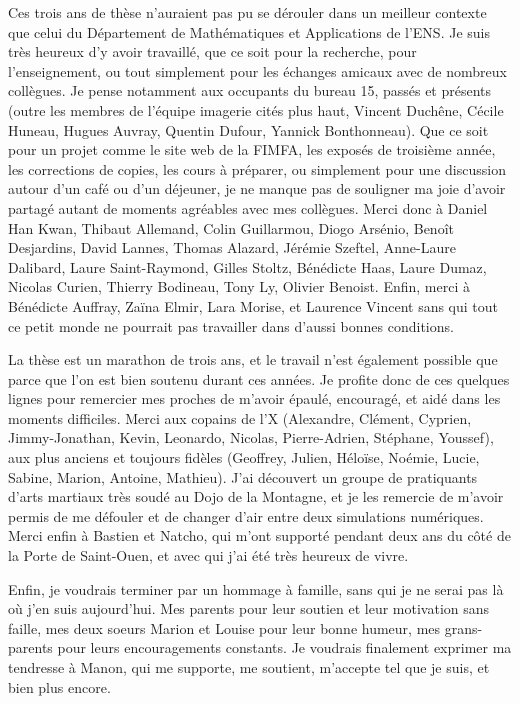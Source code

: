 Ces trois ans de thèse n'auraient pas pu se dérouler dans un meilleur contexte
que celui du Département de Mathématiques et Applications de l'ENS. Je suis
très heureux d'y avoir travaillé, que ce soit pour la recherche, pour
l'enseignement, ou tout simplement pour les échanges amicaux avec de nombreux
collègues. Je pense notamment aux occupants du bureau 15, passés et présents
(outre les membres de l'équipe imagerie cités plus haut, Vincent 
Duchêne, Cécile Huneau, Hugues Auvray, Quentin Dufour, Yannick Bonthonneau).
Que ce soit pour un projet comme le site web de la FIMFA, les exposés de
troisième année, les corrections de copies, les cours à préparer, ou simplement 
pour une discussion autour d'un café ou d'un déjeuner, je ne manque pas de 
souligner ma joie d'avoir partagé autant de moments agréables avec mes collègues.
Merci donc à Daniel Han Kwan, Thibaut Allemand, Colin Guillarmou, Diogo Arsénio,
Benoît Desjardins, David Lannes, Thomas Alazard, Jérémie Szeftel, Anne-Laure Dalibard,
Laure Saint-Raymond, Gilles Stoltz, Bénédicte Haas, Laure Dumaz, Nicolas Curien,
Thierry Bodineau, Tony Ly, Olivier Benoist.
Enfin, merci à Bénédicte Auffray, Zaïna Elmir, Lara Morise, et Laurence Vincent
sans qui tout ce petit monde ne pourrait pas travailler dans d'aussi bonnes
conditions. 

La thèse est un marathon de trois ans, et le travail n'est également possible
que parce que l'on est bien soutenu durant ces années. Je profite donc de ces
quelques lignes pour remercier mes proches de m'avoir épaulé, encouragé, et
aidé dans les moments difficiles. Merci aux copains de l'X (Alexandre, Clément, Cyprien,
Jimmy-Jonathan, Kevin, Leonardo, Nicolas, Pierre-Adrien, Stéphane, Youssef), aux
plus anciens et toujours fidèles (Geoffrey, Julien, Héloïse, Noémie, Lucie, Sabine,
 Marion, Antoine, Mathieu). J'ai découvert un groupe de pratiquants d'arts
 martiaux très soudé au Dojo
de la Montagne, et je les remercie de m'avoir permis de me défouler et de changer
d'air entre deux simulations numériques. Merci enfin à Bastien et Natcho, qui m'ont
supporté pendant deux ans du côté de la Porte de Saint-Ouen, et avec qui j'ai été
très heureux de vivre.

Enfin, je voudrais terminer par un hommage à famille, sans qui je ne serai pas
là où j'en suis aujourd'hui. Mes parents pour leur soutien et leur motivation
sans faille, mes deux soeurs Marion et Louise pour leur bonne humeur, mes
grans-parents pour leurs encouragements constants. Je voudrais finalement exprimer
ma tendresse à Manon, qui me supporte, me soutient, m'accepte
tel que je suis, et bien plus encore.



